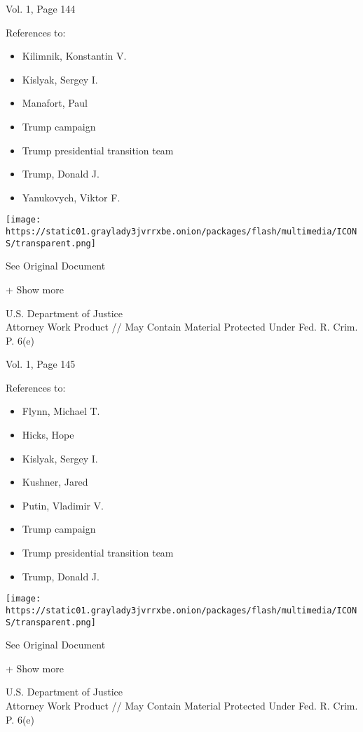 Vol. 1, Page 144

References to:

\begin{itemize}
\tightlist
\item
  Kilimnik, Konstantin V.
\item
  Kislyak, Sergey I.
\item
  Manafort, Paul 
\item
  Trump campaign
\item
  Trump presidential transition team
\item
  Trump, Donald J.
\item
  Yanukovych, Viktor F.
\end{itemize}

\protect\hyperlink{}{}

\texttt{[image: https://static01.graylady3jvrrxbe.onion/packages/flash/multimedia/ICONS/transparent.png]}

See Original Document

+ Show more

U.S. Department of Justice\\
Attorney Work Product // May Contain Material Protected Under Fed. R.
Crim. P. 6(e)

Vol. 1, Page 145

References to:

\begin{itemize}
\tightlist
\item
  Flynn, Michael T.
\item
  Hicks, Hope
\item
  Kislyak, Sergey I.
\item
  Kushner, Jared
\item
  Putin, Vladimir V.
\item
  Trump campaign
\item
  Trump presidential transition team
\item
  Trump, Donald J.
\end{itemize}

\protect\hyperlink{}{}

\texttt{[image: https://static01.graylady3jvrrxbe.onion/packages/flash/multimedia/ICONS/transparent.png]}

See Original Document

+ Show more

U.S. Department of Justice\\
Attorney Work Product // May Contain Material Protected Under Fed. R.
Crim. P. 6(e)

